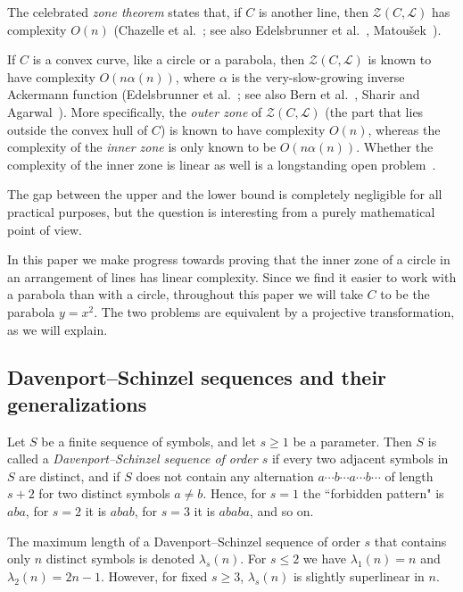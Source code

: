 \documentclass[11pt]{article}
\theoremstyle{definition}
\theoremstyle{remark}
\begin{document}
The celebrated \emph{zone theorem} states that, if $C$ is another line, then $\mathcal Z(C,\mathcal L)$ has complexity $O(n)$ (Chazelle et al.~\cite{CGL}; see also Edelsbrunner et al.~\cite{EGPPSS}, Matou\v sek~\cite{mat_DG}).

If $C$ is a convex curve, like a circle or a parabola, then $\mathcal Z(C,\mathcal L)$ is known to have complexity $O(n \alpha(n))$, where $\alpha$ is the very-slow-growing inverse Ackermann function (Edelsbrunner et al.~\cite{EGPPSS}; see also Bern et al.~\cite{BEPY}, Sharir and Agarwal~\cite{DS_book}). More specifically, the \emph{outer zone} of $\mathcal Z(C,\mathcal L)$ (the part that lies outside the convex hull of $C$) is known to have complexity $O(n)$, whereas the complexity of the \emph{inner zone} is only known to be $O(n \alpha(n))$. Whether the complexity of the inner zone is linear as well is a longstanding open problem~\cite{BEPY, DS_book}.

The gap between the upper and the lower bound is completely negligible for all practical purposes, but the question is interesting from a purely mathematical point of view.

In this paper we make progress towards proving that the inner zone of a circle in an arrangement of lines has linear complexity. Since we find it easier to work with a parabola than with a circle, throughout this paper we will take $C$ to be the parabola $y=x^2$. The two problems are equivalent by a projective transformation, as we will explain.

\subsection{Davenport--Schinzel sequences and their generalizations}

Let $S$ be a finite sequence of symbols, and let $s\ge 1$ be a parameter. Then $S$ is called a \emph{Davenport--Schinzel sequence of order $s$} if every two adjacent symbols in $S$ are distinct, and if $S$ does not contain any alternation $a\cdots b\cdots a\cdots b\cdots$ of length $s+2$ for two distinct symbols $a\neq b$. Hence, for $s=1$ the ``forbidden pattern" is $aba$, for $s=2$ it is $abab$, for $s=3$ it is $ababa$, and so on.

The maximum length of a Davenport--Schinzel sequence of order $s$ that contains only $n$ distinct symbols is denoted $\lambda_s(n)$. For $s\le 2$ we have $\lambda_1(n) = n$ and $\lambda_2(n) = 2n-1$. However, for fixed $s\ge 3$, $\lambda_s(n)$ is slightly superlinear in $n$.
\end{document}
